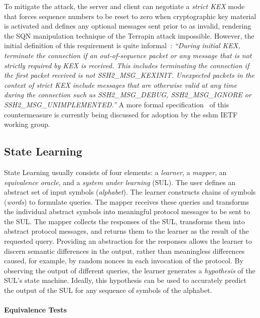 To mitigate the attack, the server and client can negotiate a \emph{strict KEX} mode that forces sequence numbers to be reset to zero when cryptographic key material is activated and defines any optional messages sent prior to \msgnewkeys as invalid, rendering the SQN manipulation technique of the Terrapin attack impossible. However, the initial definition of this requirement is quite informal~\cite[Section 1.10]{protocolopenssh}: \emph{``During initial KEX, terminate the connection if an out-of-sequence packet or any message that is not strictly required by KEX is received. This includes terminating the connection if the first packet received is not SSH2\_MSG\_KEXINIT. Unexpected packets in the context of strict KEX include messages that are otherwise  valid at any time during the connection such as SSH2\_MSG\_DEBUG, SSH2\_MSG\_IGNORE or SSH2\_MSG\_UNIMPLEMENTED.''} A more formal specification~\cite{ietf-sshm-strict-kex-00} of this countermeasure is currently being discussed for adoption by the sshm IETF working group.

\subsection{State Learning}

State Learning usually consists of four elements: a \textit{learner}, a \textit{mapper}, an \textit{equivalence oracle}, and a \textit{system under learning} (SUL). The user defines an abstract set of input symbols (\textit{alphabet}). The learner constructs chains of symbols (\textit{words}) to formulate queries. The mapper receives these queries and transforms the individual abstract symbols into meaningful protocol messages to be sent to the SUL. The mapper collects the responses of the SUL, transforms them into abstract protocol messages, and returns them to the learner as the result of the requested query. Providing an abstraction for the responses allows the learner to discern semantic differences in the output, rather than meaningless differences caused, for example, by random nonces in each invocation of the protocol. By observing the output of different queries, the learner generates a \textit{hypothesis} of the SUL's state machine. Ideally, this hypothesis can be used to accurately predict the output of the SUL for any sequence of symbols of the alphabet.

\paragraph{Equivalence Tests}

